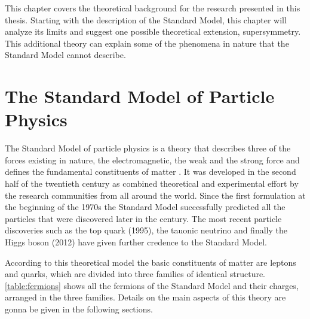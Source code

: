 
This chapter covers the theoretical background for the research presented in this thesis. Starting with the description of the Standard Model, this chapter will analyze its limits and suggest one possible theoretical extension, supersymmetry. This additional theory can explain some of the phenomena in nature that the Standard Model cannot describe.

\section{The Standard Model of Particle Physics}

The Standard Model of particle physics is a theory that describes three of the forces existing in nature, the electromagnetic, the weak and the strong force and defines the fundamental constituents of matter \cite{Spiesberger:2000ks}. It was developed in the second half of the twentieth century as combined theoretical and experimental effort by the research communities from all around the world. Since the first formulation at the beginning of the 1970s the Standard Model successfully predicted all the particles that were discovered later in the century. The most recent particle discoveries such as the top quark \cite{Campagnari:1996ai} (1995), the tauonic neutrino \cite{Agafonova:2015jxn} and finally the Higgs boson \cite{Aad:2012tfa,Chatrchyan:2012xdj}(2012) have given further credence to the Standard Model. 

According to this theoretical model the basic constituents of matter are leptons and quarks, which are divided into three families of identical structure. \autoref{table:fermions} shows all the fermions of the Standard Model and their charges, arranged in the three families. Details on the main aspects of this theory are gonna be given in the following sections.

